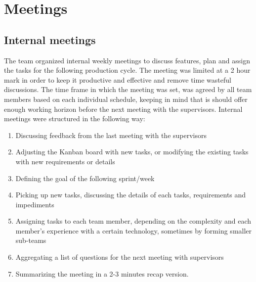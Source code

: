     \section{Meetings}
        \subsection{Internal meetings}
        The team organized internal weekly meetings to discuss features, plan and assign the tasks for the following production cycle. The meeting was limited at a 2 hour mark in order to keep it productive and effective and remove time wasteful discussions. The time frame in which the meeting was set, was agreed by all team members based on each individual schedule, keeping in mind that is should offer enough working horizon before the next meeting with the supervisors.
        Internal meetings were structured in the following way:
        \begin{enumerate}
            \item Discussing feedback from the last meeting with the supervisors
            \item Adjusting the Kanban board with new tasks, or modifying the existing tasks with new requirements or details
            \item Defining the goal of the following sprint/week
            \item Picking up new tasks, discussing the details of each tasks, requirements and impediments
            \item Assigning tasks to each team member, depending on the complexity and each member’s experience with a certain technology, sometimes by forming smaller sub-teams
            \item Aggregating a list of questions for the next meeting with supervisors
            \item Summarizing the meeting in a 2-3 minutes recap version.
        \end{enumerate}
        
